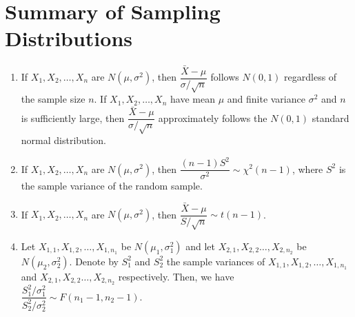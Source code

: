\section{Summary of Sampling Distributions}
\begin{enumerate}
    \item If $X_1, X_2, \dots, X_n$ are $N(\mu, \sigma^2)$, then $\dfrac{\bar{X} - \mu}{\sigma/\sqrt{n}}$ follows $N(0,1)$ regardless of the sample size $n$. If $X_1, X_2, \dots, X_n$ have mean $\mu$ and finite variance $\sigma^2$ and $n$ is sufficiently large, then $\dfrac{\bar{X} - \mu}{\sigma/\sqrt{n}}$ approximately follows the $N(0,1)$ standard normal distribution.
    \item If $X_1, X_2, \dots, X_n$ are $N(\mu, \sigma^2)$, then $\dfrac{(n -1)S^2}{\sigma^2} \sim \chi^2(n-1)$, where $S^2$ is the sample variance of the random sample.
    \item If $X_1, X_2, \dots , X_n$ are $N(\mu, \sigma^2)$, then $\dfrac{\bar{X} - \mu }{S/\sqrt{n}} \sim t(n-1)$.
    \item Let $X_{1,1}, X_{1,2}, \dots, X_{1,n_1}$ be $N(\mu_1, \sigma_1^2)$ and let $X_{2,1}, X_{2,2} \dots, X_{2,n_2}$ be $N(\mu_2, \sigma_2^2)$. Denote by $S_1^2$ and $S_2^2$ the sample variances of $X_{1,1}, X_{1,2}, \dots, X_{1,n_1}$ and $X_{2,1}, X_{2,2} \dots, X_{2,n_2}$ respectively. Then, we have $\dfrac{S_1^2/\sigma_1^2}{S_2^2/\sigma_2^2} \sim F(n_1 - 1 , n_2 - 1)$.
\end{enumerate}